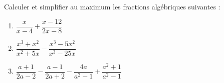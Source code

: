 \begin{exercice}[]
Calculer et simplifier au maximum les fractions algébriques suivantes :\\
\begin{enumerate}
\item $\dfrac{x}{x-4} + \dfrac{x-12}{2x-8}$
\item $\dfrac{x^3+x^2}{x^2+5x} - \dfrac{x^3-5x^2}{x^3-25x}$
\item $\dfrac{a+1}{2a-2} - \dfrac{a-1}{2a+2} - \dfrac{4a}{a^2-1}+ \dfrac{a^2+1}{a^2-1}$
\end{enumerate}
\end{exercice}



